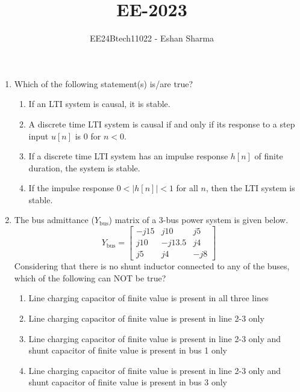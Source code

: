\documentclass[journal,12pt,onecolumn]{IEEEtran}
\theoremstyle{remark}
\begin{document}

\vspace{3cm}

\title{EE-2023}
\author{EE24Btech11022 - Eshan Sharma}
\maketitle

\renewcommand{\thefigure}{\theenumi}
\renewcommand{\thetable}{\theenumi}



\begin{enumerate}
\item Which of the following statement(s) is/are true?

\begin{enumerate}
	\item If an LTI system is causal, it is stable.
	\item A discrete time LTI system is causal if and only if its response to a step input $u[n]$ is $0$ for $n < 0$.
	\item If a discrete time LTI system has an impulse response $h[n]$ of finite duration, the system is stable.
	\item If the impulse response $0 < |h[n]| < 1$ for all $n$, then the LTI system is stable.
\end{enumerate}

\item The bus admittance ($Y_{\text{bus}}$) matrix of a 3-bus power system is given below.
\[
Y_{\text{bus}} = 
\begin{bmatrix}
	-j15 & j10 & j5 \\
	j10 & -j13.5 & j4 \\
	j5 & j4 & -j8
\end{bmatrix}
\]
Considering that there is no shunt inductor connected to any of the buses, which of the following can NOT be true?

\begin{enumerate}
	\item Line charging capacitor of finite value is present in all three lines
	\item Line charging capacitor of finite value is present in line 2-3 only
	\item Line charging capacitor of finite value is present in line 2-3 only and shunt capacitor of finite value is present in bus 1 only
	\item Line charging capacitor of finite value is present in line 2-3 only and shunt capacitor of finite value is present in bus 3 only
\end{enumerate}


\end{enumerate}
\end{document}
